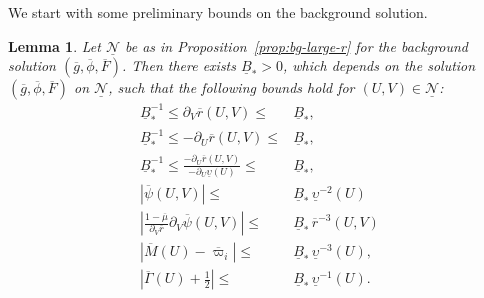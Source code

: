 \documentclass[10pt, reqno]{amsart}
\newtheorem{lemma}[theorem]{Lemma}
\theoremstyle{definition}
\theoremstyle{remark}
\theoremstyle{conjecture}
\numberwithin{equation}{section}
\newcommand{\rd}{\partial}
\newcommand{\0}{\emptyset}
\newcommand{\Gmm}{\Gamma}
\newcommand{\ups}{\upsilon}
\newcommand{\calN}{\mathcal N}
\newcommand{\gbg}{\overline{g}}					%
\newcommand{\Fbg}{\overline{F}}					%
\newcommand{\phibg}{\overline{\phi}}				%
\newcommand{\rbg}{\overline{r}}					%
\newcommand{\varpibg}{\overline{\varpi}}				%
\newcommand{\mubg}{\overline{\mu}}				%
\newcommand{\Abs}[1]{\left\vert #1 \right\vert}
\begin{document}
 
 We start with some preliminary bounds on the background solution.
\begin{lemma} \label{lem:inst-bg}
Let $\underline{\calN}$ be as in Proposition~\ref{prop:bg-large-r} for the background solution $(\gbg, \phibg, \Fbg)$. 
Then there exists $\underline{B}_{\ast} > 0$, which depends on the solution $(\gbg, \phibg, \Fbg)$ on $\underline{\calN}$, such that the following bounds hold for $(U, V) \in \underline{\calN}$:
\begin{align}
	\underline{B}_{\ast}^{-1} \leq \rd_{V} \rbg(U, V) \leq & \underline{B}_{\ast}, \label{eq:inst-bg:dvr} \\
	\underline{B}_{\ast}^{-1} \leq -\rd_{U} \rbg(U, V) \leq & \underline{B}_{\ast}, \label{eq:inst-bg:dur} \\
	\underline{B}_{\ast}^{-1} \leq \frac{-\rd_{U} \rbg(U, V)}{-\rd_{U} \underline{\ups}(U)} \leq & \underline{B}_{\ast}, \label{eq:inst-bg:duups} \\
	\Abs{\overline{\psi}(U, V)} \leq & \underline{B}_{\ast} \, \underline{\ups}^{-2}(U) \label{eq:inst-bg:psi} \\
	\Abs{\frac{1-\mubg}{\rd_{V} \rbg}\rd_{V} \overline{\psi}(U, V)} \leq & \underline{B}_{\ast} \, \rbg^{-3}(U, V) \label{eq:inst-bg:dvpsi}\\	
	\Abs{\overline{M}(U) - \varpibg_{i}} \leq & \underline{B}_{\ast} \, \underline{\ups}^{-3} (U) , \label{eq:inst-bg:M} \\
	\Abs{\overline{\Gmm}(U) + \frac{1}{2}} \leq & \underline{B}_{\ast} \, \underline{\ups}^{-1} (U) .	\label{eq:inst-bg:Gmm}
\end{align}
\end{lemma}
\end{document}
